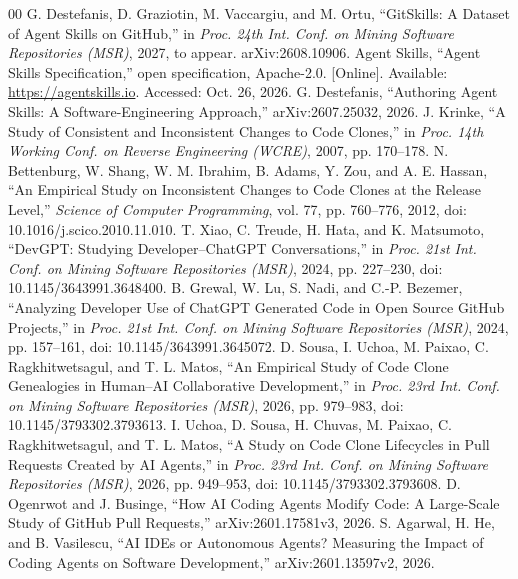 \documentclass[conference]{IEEEtran}
\begin{document}
\begin{thebibliography}{00}
G. Destefanis, D. Graziotin, M. Vaccargiu, and M. Ortu, ``GitSkills: A Dataset of Agent Skills on GitHub,'' in \emph{Proc. 24th Int. Conf. on Mining Software Repositories (MSR)}, 2027, to appear. arXiv:2608.10906.
Agent Skills, ``Agent Skills Specification,'' open specification, Apache-2.0. [Online]. Available: \url{https://agentskills.io}. Accessed: Oct. 26, 2026.
G. Destefanis, ``Authoring Agent Skills: A Software-Engineering Approach,'' arXiv:2607.25032, 2026.
J. Krinke, ``A Study of Consistent and Inconsistent Changes to Code Clones,'' in \emph{Proc. 14th Working Conf. on Reverse Engineering (WCRE)}, 2007, pp. 170--178.
N. Bettenburg, W. Shang, W. M. Ibrahim, B. Adams, Y. Zou, and A. E. Hassan, ``An Empirical Study on Inconsistent Changes to Code Clones at the Release Level,'' \emph{Science of Computer Programming}, vol. 77, pp. 760--776, 2012, doi: 10.1016/j.scico.2010.11.010.
T. Xiao, C. Treude, H. Hata, and K. Matsumoto, ``DevGPT: Studying Developer--ChatGPT Conversations,'' in \emph{Proc. 21st Int. Conf. on Mining Software Repositories (MSR)}, 2024, pp. 227--230, doi: 10.1145/3643991.3648400.
B. Grewal, W. Lu, S. Nadi, and C.-P. Bezemer, ``Analyzing Developer Use of ChatGPT Generated Code in Open Source GitHub Projects,'' in \emph{Proc. 21st Int. Conf. on Mining Software Repositories (MSR)}, 2024, pp. 157--161, doi: 10.1145/3643991.3645072.
D. Sousa, I. Uchoa, M. Paixao, C. Ragkhitwetsagul, and T. L. Matos, ``An Empirical Study of Code Clone Genealogies in Human--AI Collaborative Development,'' in \emph{Proc. 23rd Int. Conf. on Mining Software Repositories (MSR)}, 2026, pp. 979--983, doi: 10.1145/3793302.3793613.
I. Uchoa, D. Sousa, H. Chuvas, M. Paixao, C. Ragkhitwetsagul, and T. L. Matos, ``A Study on Code Clone Lifecycles in Pull Requests Created by AI Agents,'' in \emph{Proc. 23rd Int. Conf. on Mining Software Repositories (MSR)}, 2026, pp. 949--953, doi: 10.1145/3793302.3793608.
D. Ogenrwot and J. Businge, ``How AI Coding Agents Modify Code: A Large-Scale Study of GitHub Pull Requests,'' arXiv:2601.17581v3, 2026.
S. Agarwal, H. He, and B. Vasilescu, ``AI IDEs or Autonomous Agents? Measuring the Impact of Coding Agents on Software Development,'' arXiv:2601.13597v2, 2026.

\end{thebibliography}
\end{document}
